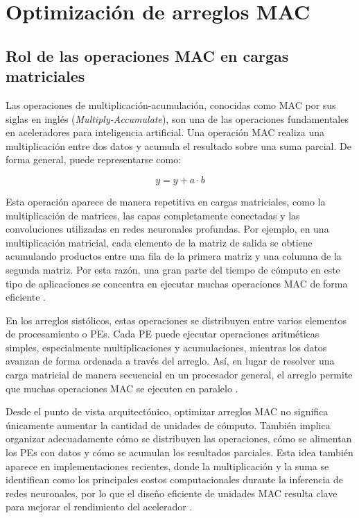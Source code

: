 \documentclass[conference]{IEEEtran}
\begin{document}
\section{Optimización de arreglos MAC}

\subsection{Rol de las operaciones MAC en cargas matriciales}

Las operaciones de multiplicación-acumulación, conocidas como MAC por sus siglas en inglés (\textit{Multiply-Accumulate}), son una de las operaciones fundamentales en aceleradores para inteligencia artificial. Una operación MAC realiza una multiplicación entre dos datos y acumula el resultado sobre una suma parcial. De forma general, puede representarse como:

\begin{equation}
    y = y + a \cdot b
\end{equation}

Esta operación aparece de manera repetitiva en cargas matriciales, como la multiplicación de matrices, las capas completamente conectadas y las convoluciones utilizadas en redes neuronales profundas. Por ejemplo, en una multiplicación matricial, cada elemento de la matriz de salida se obtiene acumulando productos entre una fila de la primera matriz y una columna de la segunda matriz. Por esta razón, una gran parte del tiempo de cómputo en este tipo de aplicaciones se concentra en ejecutar muchas operaciones MAC de forma eficiente \cite{xu2023survey}.

En los arreglos sistólicos, estas operaciones se distribuyen entre varios elementos de procesamiento o PEs. Cada PE puede ejecutar operaciones aritméticas simples, especialmente multiplicaciones y acumulaciones, mientras los datos avanzan de forma ordenada a través del arreglo. Así, en lugar de resolver una carga matricial de manera secuencial en un procesador general, el arreglo permite que muchas operaciones MAC se ejecuten en paralelo \cite{xu2023survey}.

Desde el punto de vista arquitectónico, optimizar arreglos MAC no significa únicamente aumentar la cantidad de unidades de cómputo. También implica organizar adecuadamente cómo se distribuyen las operaciones, cómo se alimentan los PEs con datos y cómo se acumulan los resultados parciales. Esta idea también aparece en implementaciones recientes, donde la multiplicación y la suma se identifican como los principales costos computacionales durante la inferencia de redes neuronales, por lo que el diseño eficiente de unidades MAC resulta clave para mejorar el rendimiento del acelerador \cite{cao2025hmsa}.
\end{document}
